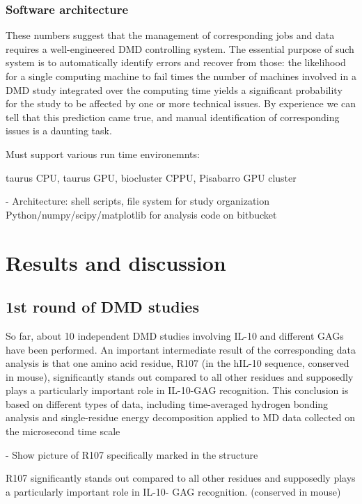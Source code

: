 \subsubsection{Software architecture}

 These numbers suggest that the
management of corresponding jobs and data requires a well-engineered DMD
controlling system. The essential purpose of such system is to automatically
identify errors and recover from those: the likelihood for a single computing
machine to fail times the number of machines involved in a DMD study integrated
over the computing time yields a significant probability for the study to be
affected by one or more technical issues. By experience we can tell that this
prediction came true, and manual identification of corresponding issues is a
daunting task.

Must support various run time environemnts:

taurus CPU, taurus GPU, biocluster CPPU, Pisabarro GPU cluster


        - Architecture:
            shell scripts, file system for study organization
            Python/numpy/scipy/matplotlib for analysis
            code on bitbucket



\section{Results and discussion}

\subsection{1st round of DMD studies}



So far, about 10 independent DMD studies involving IL-10 and different GAGs have
been performed. An important intermediate result of the corresponding data analysis
is that one amino acid residue, R107 (in the hIL-10 sequence, conserved in mouse), significantly
stands out compared to all other residues and supposedly plays a particularly
important role in IL-10-GAG recognition. This conclusion is based on different types
of data, including time-averaged hydrogen bonding analysis and single-residue energy
decomposition applied to MD data collected on the microsecond time scale

- Show picture of R107 specifically marked in the structure


R107 significantly stands out compared to all other residues
and supposedly plays a particularly important role in IL-10-
GAG recognition.
(conserved in mouse)

